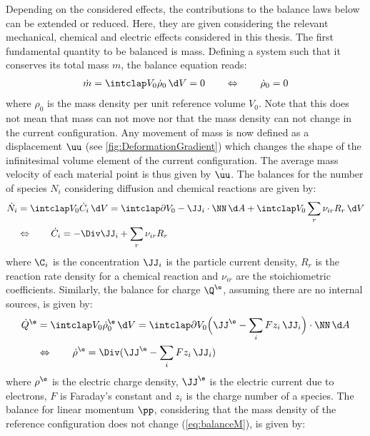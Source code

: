 Depending on the considered effects, the contributions to the balance laws below can be extended or reduced. Here, they are given considering the relevant mechanical, chemical and electric effects considered in this thesis. The first fundamental quantity to be balanced is mass. Defining a system such that it conserves its total mass $m$, the balance equation reads:
\begin{align}
  \dot m = \intVO \dot\rho_0 \dV = 0 \qquad \Leftrightarrow \qquad \dot\rho_0 = 0
  \label{eq:balanceM}
\end{align}
where $\rho_0$ is the mass density per unit reference volume $V_0$. Note that this does not mean that mass can not move nor that the mass density can not change in the current configuration. Any movement of mass is now defined as a displacement $\uu$ (see \cref{fig:DeformationGradient}) which changes the shape of the infinitesimal volume element of the current configuration. The average mass velocity of each material point is thus given by $\dot \uu$. The balances for the number of species $N_i$ considering diffusion and chemical reactions are given by:
\begin{align}
  \begin{aligned}
  \dot N_i  &= \intVO \dot C_i \dV  = \intdVO -\JJ_i \cdot \NN\dA  +  \intVO \sum_r \nu_{ir } R_r \dV \\
            &\Leftrightarrow \qquad \dot C_i = -\Div\JJ_i + \sum_r \nu_{ir } R_r 
  \end{aligned}
  \label{eq:balanceC}
\end{align}  
where $\C_i$ is the concentration $\JJ_i$ is the particle current density, $R_r$ is the reaction rate density for a chemical reaction and $\nu_{ir}$ are the stoichiometric coefficients. Similarly, the balance for charge $\Q^\e$, assuming there are no internal sources, is given by:
\begin{align}
  \begin{aligned}
  \dot Q^\e &= \intVO \dot \rho^\e_0 \dV = \intdVO \Big(\JJ^\e-\sum_i Fz_i\,\JJ_i\Big) \cdot \NN\dA \\
            &\Leftrightarrow \qquad \dot \rho^{\e} = \Div(\JJ^\e - \sum_i Fz_i\, \JJ_i)
  \end{aligned}
\end{align}
where $\rho^\e$ is the electric charge density, $\JJ^\e$ is the electric current due to electrons, $F$ is Faraday's constant and $z_i$ is the charge number of a species. The balance for linear momentum $\pp$, considering that the mass density of the reference configuration does not change (\cref{eq:balanceM}), is given by:
